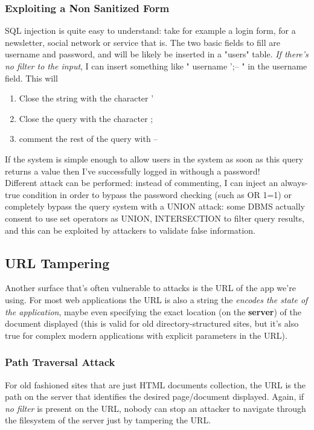 \documentclass{article}
\begin{document}
				\subsubsection{Exploiting a Non Sanitized Form}
					SQL injection is quite easy to understand: take for example a login form, for a newsletter, social network or service that is. The two basic fields to fill are username and password, and will be likely be inserted in a "users" table. \emph{If there's no filter to the input}, I can insert something like " username ';-- " in the username field. This will 
					\begin{enumerate}
						\item Close the string with the character '
						\item Close the query with the character ;
						\item comment the rest of the query with --
					\end{enumerate}
					If the system is simple enough to allow users in the system as soon as this query returns a value then I've successfully logged in withough a password!\\
					Different attack can be performed: instead of commenting, I can inject an always-true condition in order to bypass the password checking (such as OR 1=1) or completely bypass the query system with a UNION attack: some DBMS actually consent to use set operators as UNION, INTERSECTION to filter query results, and this can be exploited by attackers to validate false information.
					
			\subsection{URL Tampering}
				Another surface that's often vulnerable to attacks is the URL of the app we're using. For most web applications the URL is also a string the \emph{encodes the state of the application}, maybe even specifying the exact location (on the \textbf{server}) of the document displayed (this is valid for old directory-structured sites, but it's also true for complex modern applications with explicit parameters in the URL). 
				
				\subsubsection{Path Traversal Attack}
					For old fashioned sites that are just HTML documents collection, the URL is the path on the server that identifies the desired page/document displayed. Again, if \emph{no filter} is present on the URL, nobody can stop an attacker to navigate through the filesystem of the server just by tampering the URL. 
	
\end{document}
